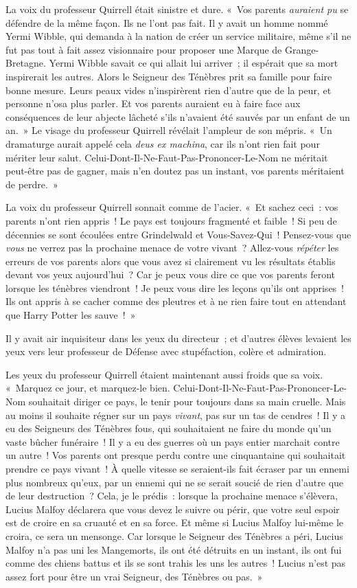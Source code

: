 La voix du professeur Quirrell était sinistre et dure.
«~Vos parents \emph{auraient pu} se défendre de la même façon.
Ils ne l'ont pas fait.
Il y avait un homme nommé Yermi Wibble, qui demanda à la nation de créer un service militaire, même s'il ne fut pas tout à fait assez visionnaire pour proposer une Marque de Grange-Bretagne.
Yermi Wibble savait ce qui allait lui arriver~; il espérait que sa mort inspirerait les autres.
Alors le Seigneur des Ténèbres prit sa famille pour faire bonne mesure.
Leurs peaux vides n'inspirèrent rien d'autre que de la peur, et personne n'osa plus parler.
Et vos parents auraient eu à faire face aux conséquences de leur abjecte lâcheté s'ils n'avaient été sauvés par un enfant de un an.~»
Le visage du professeur Quirrell révélait l'ampleur de son mépris.
«~Un dramaturge aurait appelé cela \emph{deus ex machina}, car ils n'ont rien fait pour mériter leur salut.
Celui-Dont-Il-Ne-Faut-Pas-Prononcer-Le-Nom ne méritait peut-être pas de gagner, mais n'en doutez pas un instant, vos parents méritaient de perdre.~»

La voix du professeur Quirrell sonnait comme de l'acier.
«~Et sachez ceci~: vos parents n'ont rien appris~!
Le pays est toujours fragmenté et faible~!
Si peu de décennies se sont écoulées entre Grindelwald et Vous-Savez-Qui~!
Pensez-vous que \emph{vous} ne verrez pas la prochaine menace de votre vivant~?
Allez-vous \emph{répéter} les erreurs de vos parents alors que vous avez si clairement vu les résultats établis devant vos yeux aujourd'hui~?
Car je peux vous dire ce que vos parents feront lorsque les ténèbres viendront~!
Je peux vous dire les leçons qu'ils ont apprises~!
Ils ont appris à se cacher comme des pleutres et à ne rien faire tout en attendant que Harry Potter les sauve~!~»

Il y avait air inquisiteur dans les yeux du directeur~; et d'autres élèves levaient les yeux vers leur professeur de Défense avec stupéfaction, colère et admiration.

Les yeux du professeur Quirrell étaient maintenant aussi froids que sa voix.
«~Marquez ce jour, et marquez-le bien.
Celui-Dont-Il-Ne-Faut-Pas-Prononcer-Le-Nom souhaitait diriger ce pays, le tenir pour toujours dans sa main cruelle.
Mais au moins il souhaite régner sur un pays \emph{vivant}, pas sur un tas de cendres~!
Il y a eu des Seigneurs des Ténèbres fous, qui souhaitaient ne faire du monde qu'un vaste bûcher funéraire~!
Il y a eu des guerres où un pays entier marchait contre un autre~!
Vos parents ont presque perdu contre une cinquantaine qui souhaitait prendre ce pays vivant~!
À quelle vitesse se seraient-ils fait écraser par un ennemi plus nombreux qu'eux, par un ennemi qui ne se serait soucié de rien d'autre que de leur destruction~?
Cela, je le prédis~: lorsque la prochaine menace s'élèvera, Lucius Malfoy déclarera que vous devez le suivre ou périr, que votre seul espoir est de croire en sa cruauté et en sa force.
Et même si Lucius Malfoy lui-même le croira, ce sera un mensonge.
Car lorsque le Seigneur des Ténèbres a péri, Lucius Malfoy n'a pas uni les Mangemorts, ils ont été détruits en un instant, ils ont fui comme des chiens battus et ils se sont trahis les uns les autres~!
Lucius n'est pas assez fort pour être un vrai Seigneur, des Ténèbres ou pas.~»

